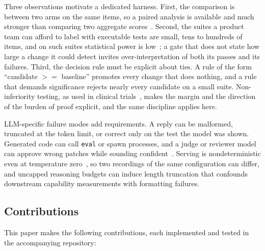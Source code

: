 \documentclass[conference]{IEEEtran}
\begin{document}
Three observations motivate a dedicated harness. First, the comparison is between two arms on the same items, so a paired analysis is available and much stronger than comparing two aggregate scores~\cite{dietterich1998,miller2024}. Second, the suites a product team can afford to label with executable tests are small, tens to hundreds of items, and on such suites statistical power is low~\cite{card2020power}; a gate that does not state how large a change it could detect invites over-interpretation of both its passes and its failures. Third, the decision rule must be explicit about ties. A rule of the form ``candidate $>=$ baseline'' promotes every change that does nothing, and a rule that demands significance rejects nearly every candidate on a small suite. Non-inferiority testing, as used in clinical trials~\cite{walker2011}, makes the margin and the direction of the burden of proof explicit, and the same discipline applies here.

LLM-specific failure modes add requirements. A reply can be malformed, truncated at the token limit, or correct only on the test the model was shown. Generated code can call \texttt{eval} or spawn processes, and a judge or reviewer model can approve wrong patches while sounding confident~\cite{zheng2023judge}. Serving is nondeterministic even at temperature zero~\cite{yuan2025nondeterminism,he2025nondeterminism}, so two recordings of the same configuration can differ, and uncapped reasoning budgets can induce length truncation that confounds downstream capability measurements with formatting failures.

\subsection{Contributions}
\label{sec:intro-contributions}

This paper makes the following contributions, each implemented and tested in the accompanying repository:
\end{document}
